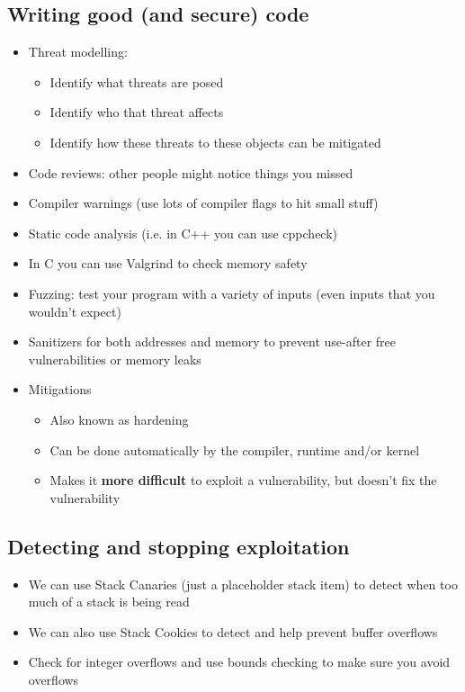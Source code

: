 \documentclass{article}
\begin{document}
\subsection{Writing good (and secure) code}
\begin{itemize}
    \item Threat modelling:
    \begin{itemize}
        \item Identify what threats are posed
        \item Identify who that threat affects
        \item Identify how these threats to these objects can be mitigated
    \end{itemize}
    \item Code reviews: other people might notice things you missed
    \item Compiler warnings (use lots of compiler flags to hit small stuff)
    \item Static code analysis (i.e. in C++ you can use cppcheck)
    \item In C you can use Valgrind to check memory safety
    \item Fuzzing: test your program with a variety of inputs (even inputs that you wouldn't expect)
    \item Sanitizers for both addresses and memory to prevent use-after free vulnerabilities or memory leaks
    \item Mitigations
    \begin{itemize}
        \item Also known as hardening
        \item Can be done automatically by the compiler, runtime and/or kernel
        \item Makes it \textbf{more difficult} to exploit a vulnerability, but doesn't fix the vulnerability
    \end{itemize}
\end{itemize}
\subsection{Detecting and stopping exploitation}
\begin{itemize}
    \item We can use Stack Canaries (just a placeholder stack item) to detect when too much of a stack is being read
    \item We can also use Stack Cookies to detect and help prevent buffer overflows
    \item Check for integer overflows and use bounds checking to make sure you avoid overflows
\end{itemize}
\end{document}
